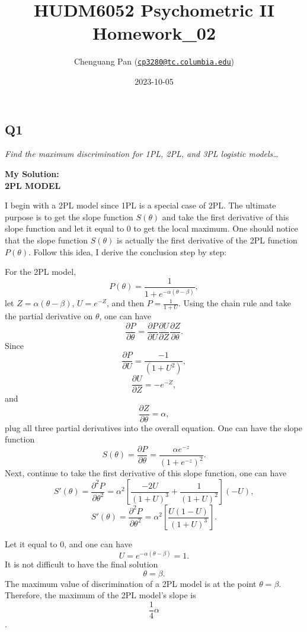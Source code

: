 \documentclass[
]{article}
\title{HUDM6052 Psychometric II Homework\_02}
\author{Chenguang Pan
(\href{mailto:cp3280@tc.columbia.edu}{\nolinkurl{cp3280@tc.columbia.edu}})}
\date{2023-10-05}
\begin{document}
\maketitle

\setcounter{tocdepth}{4}
\tableofcontents

\hypertarget{q1}{%
\subsection{Q1}\label{q1}}

\emph{Find the maximum discrimination for 1PL, 2PL, and 3PL logistic
models\ldots{}}

\textbf{My Solution:}\\
\textbf{2PL MODEL}

I begin with a 2PL model since 1PL is a special case of 2PL. The
ultimate purpose is to get the slope function \(S(\theta)\) and take the
first derivative of this slope function and let it equal to 0 to get the
local maximum. One should notice that the slope function \(S(\theta)\)
is actually the first derivative of the 2PL function \(P(\theta)\).
Follow this idea, I derive the conclusion step by step:

For the 2PL model, \[P(\theta)=\frac{1}{1+e^{-\alpha(\theta-\beta)}},\]
let \(Z = \alpha(\theta-\beta)\), \(U = e^{-Z}\), and then
\(P = \frac{1}{1+U}\). Using the chain rule and take the partial
derivative on \(\theta\), one can have
\[\frac{\partial P}{\partial \theta}=\frac{\partial P}{\partial U}\frac{\partial U}{\partial Z}\frac{\partial Z}{\partial \theta}. \]
Since \[\frac{\partial P}{\partial U}=\frac{-1}{(1+U^2)},\]
\[\frac{\partial U}{\partial Z}=-e^{-Z},\] and
\[\frac{\partial Z}{\partial \theta}= \alpha,\] plug all three partial
derivatives into the overall equation. One can have the slope function
\[S(\theta)=\frac{\partial P}{\partial \theta}=\frac{\alpha e^{-z}}{(1 + e^{-z})^2}.\]
Next, continue to take the first derivative of this slope function, one
can have
\[S'(\theta)=\frac{\partial^2 P}{\partial \theta^2}=\alpha^2[\frac{-2U}{(1+U)^3}+\frac{1}{(1+U)^2}](-U),\]
\[S'(\theta)=\frac{\partial^2 P}{\partial \theta^2}=\alpha^2[\frac{U(1-U)}{(1+U)^3}].\]

Let it equal to 0, and one can have \[U=e^{-\alpha(\theta-\beta)}=1.\]
It is not difficult to have the final solution \[\theta = \beta.\] The
maximum value of discrimination of a 2PL model is at the point
\(\theta =\beta\).\\
Therefore, the maximum of the 2PL model's slope is
\[\frac{1}{4}\alpha\].
\end{document}

